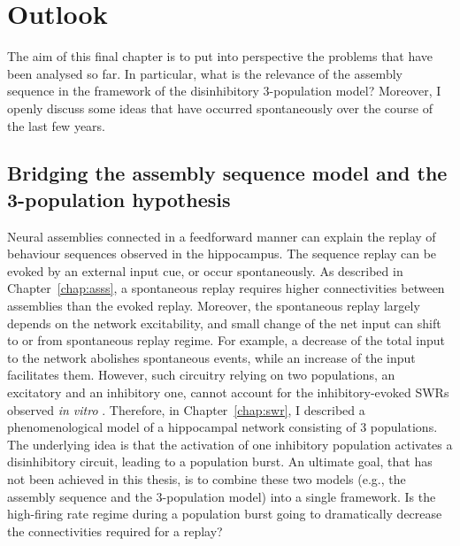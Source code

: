 \chapter{Outlook}
  The aim of this final chapter is to put into perspective the problems that
  have been analysed so far. In particular, what is the relevance of the
  assembly sequence in the framework of the disinhibitory 3-population model?
  Moreover, I openly discuss some ideas that have occurred spontaneously over
  the course of the last few years.

\section{Bridging the assembly sequence model and the 3-population hypothesis}
  Neural assemblies connected in a feedforward manner can explain the replay of
  behaviour sequences observed in the hippocampus. The sequence replay can be
  evoked by an external input cue, or occur spontaneously. As described in
  Chapter~\ref{chap:asss}, a spontaneous replay requires higher
  connectivities between assemblies than the evoked replay. Moreover, the
  spontaneous replay largely depends on the network excitability, and small
  change of the net input can shift to or from spontaneous replay regime. For
  example, a decrease of the total input to the network abolishes spontaneous
  events, while an increase of the input facilitates them. However, such
  circuitry relying on two populations, an excitatory and an inhibitory one,
  cannot account for the inhibitory-evoked SWRs observed \textit{in vitro}
  \citep[e.g.,][]{Schlingloff2014, Kohus2016}. Therefore, in
  Chapter~\ref{chap:swr}, I described a phenomenological model of a hippocampal
  network consisting of 3 populations. The underlying idea is that the
  activation of one inhibitory population activates a disinhibitory circuit,
  leading to a population burst. An ultimate goal, that has not been achieved
  in this thesis, is to combine these two models (e.g., the assembly sequence
  and the 3-population model) into a single framework. Is the high-firing rate
  regime during a population burst going to dramatically decrease the
  connectivities required for a replay?

